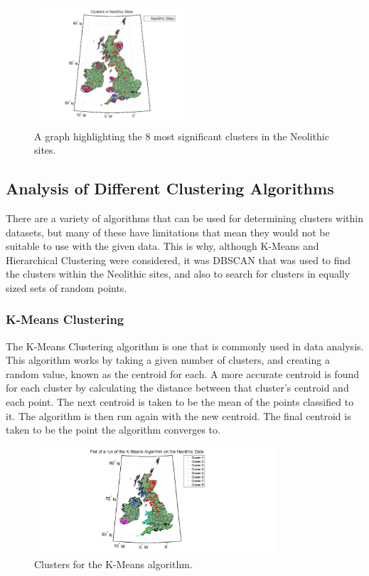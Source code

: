 \documentclass[a4paper]{article}
\begin{document}
\begin{figure}[H]
\centering
\includegraphics[width=0.5\textwidth]{CNS.jpg}
\caption{\label{fig:CNS}A graph highlighting the 8 most significant clusters in the Neolithic sites.}
\end{figure}

\subsection{Analysis of Different Clustering Algorithms}
There are a variety of algorithms that can be used for determining clusters within datasets, but many of these have limitations that mean they would not be suitable to use with the given data. This is why, although K-Means and Hierarchical Clustering were considered, it was DBSCAN that was used to find the clusters within the Neolithic sites, and also to search for clusters in equally sized sets of random points. 

\subsubsection{K-Means Clustering}
The K-Means Clustering algorithm is one that is commonly used in data analysis. This algorithm works by taking a given number of clusters, and creating a random value, known as the centroid for each. 
\newline\newline
A more accurate centroid is found for each cluster by calculating the distance between that cluster's centroid and each point. The next centroid is taken to be the mean of the points classified to it. The algorithm is then run again with the new centroid. The final centroid is taken to be the point the algorithm converges to. 

\begin{figure}[H]
\centering
\includegraphics[width=0.8\textwidth]{kmeans.png}
\caption{\label{fig:kmeans}Clusters for the K-Means algorithm.}
\end{figure}
 
\end{document}
